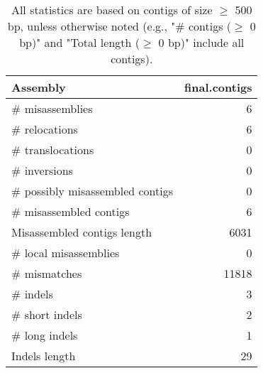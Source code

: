 \documentclass[12pt,a4paper]{article}
\begin{document}
\begin{table}[ht]
\begin{center}
\caption{All statistics are based on contigs of size $\geq$ 500 bp, unless otherwise noted (e.g., "\# contigs ($\geq$ 0 bp)" and "Total length ($\geq$ 0 bp)" include all contigs).}
\begin{tabular}{|l*{1}{|r}|}
\hline
Assembly & final.contigs \\ \hline
\# misassemblies & 6 \\ \hline
\hspace{5mm}\# relocations & 6 \\ \hline
\hspace{5mm}\# translocations & 0 \\ \hline
\hspace{5mm}\# inversions & 0 \\ \hline
\# possibly misassembled contigs & 0 \\ \hline
\# misassembled contigs & 6 \\ \hline
Misassembled contigs length & 6031 \\ \hline
\# local misassemblies & 0 \\ \hline
\# mismatches & 11818 \\ \hline
\# indels & 3 \\ \hline
\hspace{5mm}\# short indels & 2 \\ \hline
\hspace{5mm}\# long indels & 1 \\ \hline
Indels length & 29 \\ \hline
\end{tabular}
\end{center}
\end{table}
\end{document}
